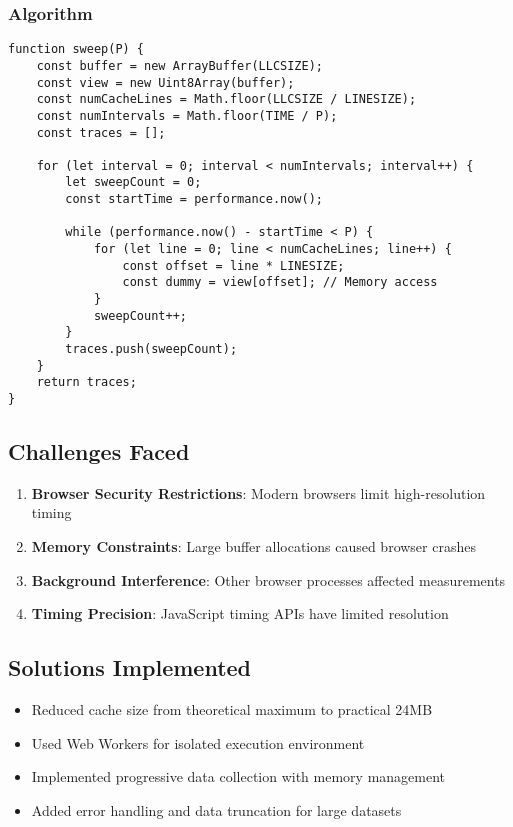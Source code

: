 \documentclass[11pt,a4paper]{article}
\begin{document}
\subsubsection{Algorithm}
\begin{lstlisting}[caption=Cache Sweep Implementation]
function sweep(P) {
    const buffer = new ArrayBuffer(LLCSIZE);
    const view = new Uint8Array(buffer);
    const numCacheLines = Math.floor(LLCSIZE / LINESIZE);
    const numIntervals = Math.floor(TIME / P);
    const traces = [];
    
    for (let interval = 0; interval < numIntervals; interval++) {
        let sweepCount = 0;
        const startTime = performance.now();
        
        while (performance.now() - startTime < P) {
            for (let line = 0; line < numCacheLines; line++) {
                const offset = line * LINESIZE;
                const dummy = view[offset]; // Memory access
            }
            sweepCount++;
        }
        traces.push(sweepCount);
    }
    return traces;
}
\end{lstlisting}

\subsection{Challenges Faced}
\begin{enumerate}
    \item \textbf{Browser Security Restrictions}: Modern browsers limit high-resolution timing
    \item \textbf{Memory Constraints}: Large buffer allocations caused browser crashes
    \item \textbf{Background Interference}: Other browser processes affected measurements
    \item \textbf{Timing Precision}: JavaScript timing APIs have limited resolution
\end{enumerate}

\subsection{Solutions Implemented}
\begin{itemize}
    \item Reduced cache size from theoretical maximum to practical 24MB
    \item Used Web Workers for isolated execution environment
    \item Implemented progressive data collection with memory management
    \item Added error handling and data truncation for large datasets
\end{itemize}
\end{document}
